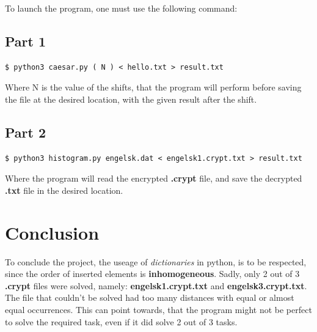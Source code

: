 \documentclass[a4paper,10pt]{article}
\begin{document}
To launch the program, one must use the following command:

\subsection{Part 1}
\begin{lstlisting}[language=command.com]
$ python3 caesar.py ( N ) < hello.txt > result.txt
\end{lstlisting}

Where N is the value of the shifts, that the program will perform before saving the file at the desired location, with the given result after the shift.

\subsection{Part 2}
\begin{lstlisting}
$ python3 histogram.py engelsk.dat < engelsk1.crypt.txt > result.txt
\end{lstlisting}

Where the program will read the encrypted \textbf{.crypt} file, and save the decrypted \textbf{.txt} file in the desired location.

\section{Conclusion}
To conclude the project, the useage of \textit{dictionaries} in python, is to be respected, since the order of inserted elements is \textbf{inhomogeneous}.
Sadly, only 2 out of 3 \textbf{.crypt} files were solved, namely: \textbf{engelsk1.crypt.txt} and \textbf{engelsk3.crypt.txt}. The file that couldn't be solved had too many distances with equal or almost equal occurrences.
This can point towards, that the program might not be perfect to solve the required task, even if it did solve 2 out of 3 tasks.
\end{document}
